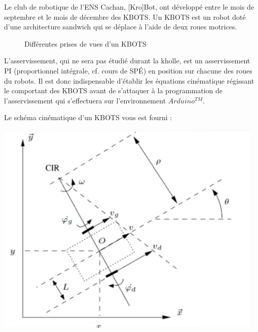 Le club de robotique de l\rq{}ENS Cachan, [Kro]Bot, ont développé entre le mois de septembre et le mois de décembre des KBOTS.
Un KBOTS est un robot doté d'une architecture sandwich qui se déplace à l'aide de deux roues motrices.

\begin{figure}[h]
\centering
	\caption{Différentes prises de vues d'un KBOTS}
	\label{fig:default}
\end{figure}

L'asservissement, qui ne sera pas étudié durant la kholle, est un asservissement PI (proportionnel intégrale, cf. cours de SPÉ) en position sur chacune des roues du robots.
Il est donc indispensable d'établir les équations cinématique régissant le comportant des KBOTS avant de s'attaquer à la programmation de l'asservissement qui s'effectuera sur l'environnement $Arduino^{TM}$.

Le schéma cinématique d'un KBOTS vous est fourni :
\begin{center}
\includegraphics[scale =0.4]{png/3_exo3.png}
\end{center}

